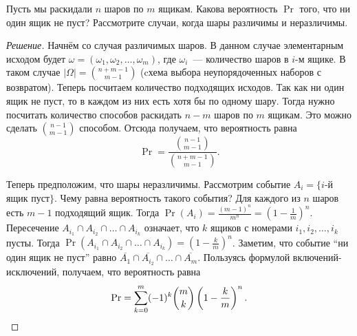 \begin{problem}
    Пусть мы раскидали \(n\) шаров по \(m\) ящикам. Какова вероятность \(\Pr\) того, что ни один ящик не пуст? Рассмотрите случаи, когда шары различимы и неразличимы.
\end{problem}
\begin{proof}[Решение]
    Начнём со случая различимых шаров. В данном случае элементарным исходом будет \(\omega = (\omega_1, \omega_2, \ldots, \omega_m)\), где \(\omega_i\)~--- количество шаров в \(i\)-м ящике. В таком случае \(|\Omega| = \binom{n + m - 1}{m - 1}\) (cхема выбора неупорядоченных наборов с возвратом). Теперь посчитаем количество подходящих исходов. Так как ни один ящик не пуст, то в каждом из них есть хотя бы по одному шару. Тогда нужно посчитать количество способов раскидать \(n - m\) шаров по \(m\) ящикам. Это можно сделать \(\binom{n - 1}{m - 1}\) способом. Отсюда получаем, что вероятность равна \[\Pr = \dfrac{\binom{n - 1}{m - 1}}{\binom{n + m - 1}{m - 1}}.\]
    
    Теперь предположим, что шары неразличимы. Рассмотрим событие \(A_i = \{i\)-й ящик пуст\(\}\). Чему равна вероятность такого события? Для каждого из \(n\) шаров есть \(m - 1\) подходящий ящик. Тогда \(\Pr(A_i) = \frac{(m - 1)^n}{m^n} = \left(1 - \frac{1}{m}\right)^n\). Пересечение \(A_{i_1} \cap A_{i_2} \cap \ldots \cap A_{i_k}\) означает, что \(k\) ящиков с номерами \(i_1, i_2,\ldots, i_k\) пусты. Тогда \(\Pr(A_{i_1} \cap A_{i_2} \cap \ldots \cap A_{i_k}) = \left(1 - \frac{k}{m}\right)^n\). Заметим, что событие ``ни один ящик не пуст'' равно \(\overline{A_{1}} \cap \overline{A_{i_2}} \cap \ldots \cap \overline{A_{m}}\). Пользуясь формулой включений-исключений, получаем, что вероятность равна
    \[\Pr = \sum\limits_{k = 0}^{m}(-1)^{k}\binom{m}{k}\left(1 - \frac{k}{m}\right)^{n}.\qedhere\]
\end{proof}

